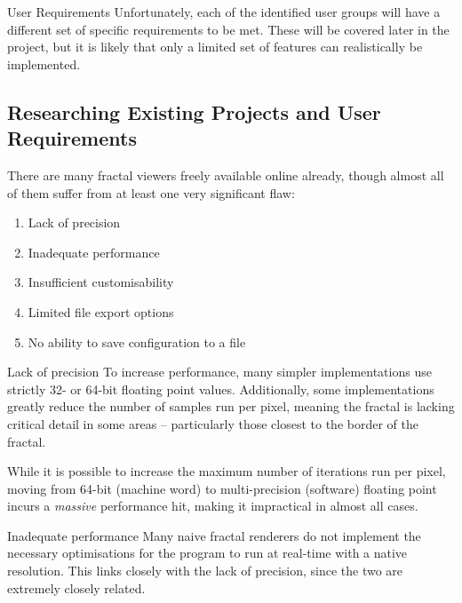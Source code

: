 \vspace{0.5cm}

\begin{greenbox}{User Requirements}
	Unfortunately, each of the identified user groups will have a different set of specific requirements to be met. These will be covered later in the project, but it is likely that only a limited set of features can realistically be implemented.
\end{greenbox}

\subsection{Researching Existing Projects and User Requirements}

\pagebreak

There are many fractal viewers freely available online already, though almost all of them suffer from at least one very significant flaw:

\begin{enumerate}
	\item{Lack of precision}
	\item{Inadequate performance}
	\item{Insufficient customisability}
	\item{Limited file export options}
	\item{No ability to save configuration to a file}
\end{enumerate}

\vspace{0.5cm}

\begin{greybox}{Lack of precision}
	To increase performance, many simpler implementations use strictly 32- or 64-bit floating point values. Additionally, some implementations greatly reduce the number of samples run per pixel, meaning the fractal is lacking critical detail in some areas -- particularly those closest to the border of the fractal.
	
	\vspace{0.25cm}
	
	While it is possible to increase the maximum number of iterations run per pixel, moving from 64-bit (machine word) to multi-precision (software) floating point incurs a \emph{massive} performance hit, making it impractical in almost all cases.
\end{greybox}

\begin{greybox}{Inadequate performance}
	Many naive fractal renderers do not implement the necessary optimisations for the program to run at real-time with a native resolution. This links closely with the lack of precision, since the two are extremely closely related.
\end{greybox}

